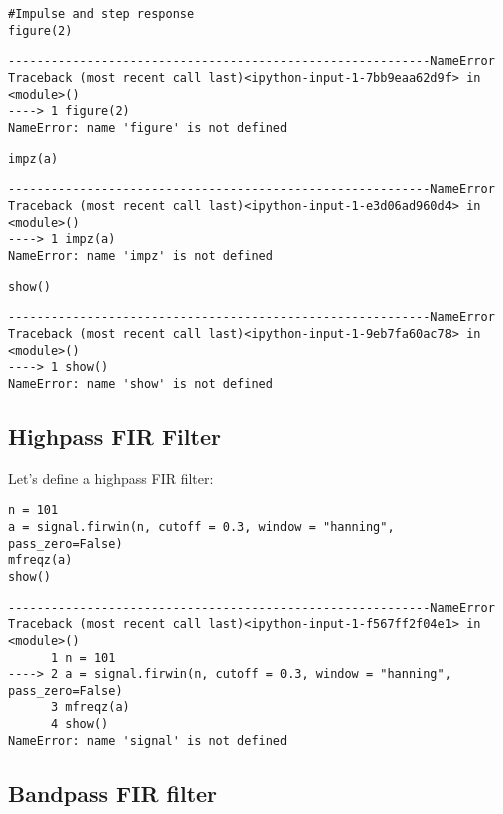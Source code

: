 \documentclass[a4paper,11pt,final]{article}
\begin{document}
\begin{verbatim}
#Impulse and step response
figure(2)
\end{verbatim}
\begin{verbatim}
-----------------------------------------------------------NameError
Traceback (most recent call last)<ipython-input-1-7bb9eaa62d9f> in
<module>()
----> 1 figure(2)
NameError: name 'figure' is not defined
\end{verbatim}

\begin{verbatim}
impz(a)
\end{verbatim}
\begin{verbatim}
-----------------------------------------------------------NameError
Traceback (most recent call last)<ipython-input-1-e3d06ad960d4> in
<module>()
----> 1 impz(a)
NameError: name 'impz' is not defined
\end{verbatim}

\begin{verbatim}
show()
\end{verbatim}
\begin{verbatim}
-----------------------------------------------------------NameError
Traceback (most recent call last)<ipython-input-1-9eb7fa60ac78> in
<module>()
----> 1 show()
NameError: name 'show' is not defined
\end{verbatim}


\subsection{Highpass FIR Filter}

Let's define a highpass FIR filter:


\begin{verbatim}
n = 101
a = signal.firwin(n, cutoff = 0.3, window = "hanning", pass_zero=False)
mfreqz(a)
show()
\end{verbatim}
\begin{verbatim}
-----------------------------------------------------------NameError
Traceback (most recent call last)<ipython-input-1-f567ff2f04e1> in
<module>()
      1 n = 101
----> 2 a = signal.firwin(n, cutoff = 0.3, window = "hanning",
pass_zero=False)
      3 mfreqz(a)
      4 show()
NameError: name 'signal' is not defined
\end{verbatim}


\subsection{Bandpass FIR filter}
\end{document}
